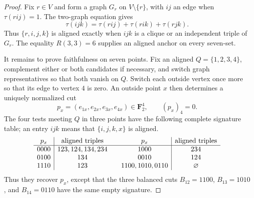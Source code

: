 \begin{proof}
Fix \(r\in V\) and form a graph \(G_r\) on \(V\setminus\{r\}\), with \(ij\)
an edge when \(\tau(rij)=1\).  The two-graph equation gives
\[
 \tau(ijk)=\tau(rij)+\tau(rik)+\tau(rjk).
\]
Thus \(\{r,i,j,k\}\) is aligned exactly when \(ijk\) is a clique or an
independent triple of \(G_r\).  The equality \(R(3,3)=6\) supplies an aligned
anchor on every seven-set.

It remains to prove faithfulness on seven points.  Fix an aligned
\(Q=\{1,2,3,4\}\), complement either or both candidates if necessary, and switch graph
representatives so that both vanish on \(Q\).  Switch each outside vertex
once more so that its edge to vertex \(4\) is zero.  An outside point \(x\)
then determines a uniquely normalized cut
\[
 p_x=(e_{1x},e_{2x},e_{3x},e_{4x})
 \in\mathbf F_2^4,\qquad (p_x)_4=0.
\]
The four tests meeting \(Q\) in three points have the following complete
signature table; an entry \(ijk\) means that \(\{i,j,k,x\}\) is aligned.
\[
\begin{array}{c|c@{\qquad}c|c}
p_x&\text{aligned triples}&p_x&\text{aligned triples}\\ \hline
0000&123,124,134,234&1000&234\\
0100&134&0010&124\\
1110&123&1100,1010,0110&\varnothing
\end{array}
\]
Thus they recover \(p_x\), except that the three balanced cuts
\(B_{12}=1100\), \(B_{13}=1010\), and \(B_{14}=0110\) have the same empty
signature.


\end{proof}
